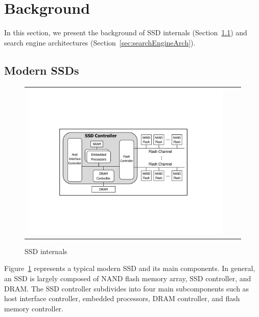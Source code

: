 

\section{Background}\label{sec:background}

In this section, we present the background of SSD internals (Section~\ref{sec:SSDInternals}) and search engine architectures (Section~\ref{sec:searchEngineArch}).

\subsection{Modern SSDs}\label{sec:SSDInternals}

\begin{figure}[htbp]
  \centering
  \begin{tabular}{ccc}
 \includegraphics[width=1.0\columnwidth]{figures/SSDInternals.pdf}
\end{tabular}
  \caption{SSD internals}
  \label{fig:SSDInternals}
 \end{figure}

Figure~\ref{fig:SSDInternals} represents a typical modern SSD and its main components. In general, an SSD is largely composed of NAND flash memory array, SSD controller, and DRAM. The SSD controller subdivides into four main subcomponents such as host interface controller, embedded processors, DRAM controller, and flash memory controller.

